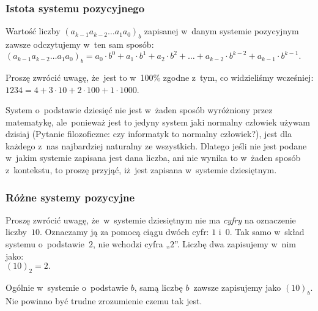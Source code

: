 \documentclass[10pt,t]{beamer}
\begin{document}
\begin{frame}
  \frametitle{Istota systemu pozycyjnego}


  Wartość liczby $( a_{ k - 1 } a_{ k - 2 } \ldots a_{ 1 } a_{ 0 } )_{ b }$ zapisanej
  w~danym systemie pozycyjnym zawsze odczytujemy w~ten sam sposób: \\
  $\displaystyle
  ( a_{ k - 1 } a_{ k - 2 } \ldots a_{ 1 } a_{ 0 } )_{ b } =
  a_{ 0 } \cdot b^{ 0 } + a_{ 1 } \cdot b^{ 1 } + a_{ 2 } \cdot b^{ 2 } + \ldots +
  a_{ k - 2 } \cdot b^{ k - 2 } + a_{ k - 1 } \cdot b^{ k - 1 }.$

  Proszę zwrócić uwagę, że~jest to w~100\% zgodne z~tym, co widzieliśmy
  wcześniej: $1234 = 4 + 3 \cdot 10 + 2 \cdot 100 + 1 \cdot 1000$.

  System o~podstawie dziesięć nie jest w~żaden sposób wyróżniony przez
  matematykę, ale~ponieważ jest to jedyny system jaki normalny człowiek
  używam dzisiaj (Pytanie filozoficzne: czy informatyk to normalny
  człowiek?), jest dla każdego z~nas najbardziej naturalny ze
  wszystkich. Dlatego jeśli nie jest podane w~jakim systemie zapisana
  jest dana liczba, ani nie wynika to w~żaden sposób z~kontekstu, to
  proszę przyjąć, iż~jest zapisana w~systemie dziesiętnym.

\end{frame}





\begin{frame}
  \frametitle{Różne systemy pozycyjne}


  Proszę zwrócić uwagę, że~w~systemie dziesiętnym nie ma \textit{cyfry}
  na oznaczenie liczby~$10$. Oznaczamy ją za pomocą ciągu dwóch cyfr: $1$
  i~$0$. Tak samo w~skład systemu o~podstawie~$2$, nie wchodzi cyfra „$2$”.
  Liczbę dwa zapisujemy w~nim jako: \\
  $(10)_{ 2 } = 2.$

  Ogólnie w~systemie o~podstawie $b$, samą liczbę $b$~zawsze zapisujemy jako
  $(10)_{ b }$. Nie powinno być trudne zrozumienie czemu tak jest.


\end{frame}
\end{document}
